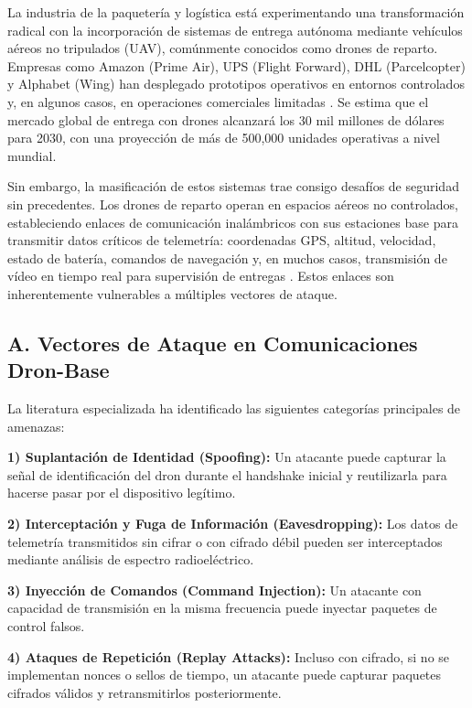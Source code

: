 La industria de la paquetería y logística está experimentando una transformación radical con la incorporación de sistemas de entrega autónoma mediante vehículos aéreos no tripulados (UAV), comúnmente conocidos como drones de reparto. Empresas como Amazon (Prime Air), UPS (Flight Forward), DHL (Parcelcopter) y Alphabet (Wing) han desplegado prototipos operativos en entornos controlados y, en algunos casos, en operaciones comerciales limitadas \cite{amazon2022drone}. Se estima que el mercado global de entrega con drones alcanzará los 30 mil millones de dólares para 2030, con una proyección de más de 500,000 unidades operativas a nivel mundial.

Sin embargo, la masificación de estos sistemas trae consigo desafíos de seguridad sin precedentes. Los drones de reparto operan en espacios aéreos no controlados, estableciendo enlaces de comunicación inalámbricos con sus estaciones base para transmitir datos críticos de telemetría: coordenadas GPS, altitud, velocidad, estado de batería, comandos de navegación y, en muchos casos, transmisión de vídeo en tiempo real para supervisión de entregas \cite{yaacoub2020drone}. Estos enlaces son inherentemente vulnerables a múltiples vectores de ataque.

\subsection*{A. Vectores de Ataque en Comunicaciones Dron-Base}

La literatura especializada ha identificado las siguientes categorías principales de amenazas:

\textbf{1) Suplantación de Identidad (Spoofing):} Un atacante puede capturar la señal de identificación del dron durante el handshake inicial y reutilizarla para hacerse pasar por el dispositivo legítimo.

\textbf{2) Interceptación y Fuga de Información (Eavesdropping):} Los datos de telemetría transmitidos sin cifrar o con cifrado débil pueden ser interceptados mediante análisis de espectro radioeléctrico.

\textbf{3) Inyección de Comandos (Command Injection):} Un atacante con capacidad de transmisión en la misma frecuencia puede inyectar paquetes de control falsos.

\textbf{4) Ataques de Repetición (Replay Attacks):} Incluso con cifrado, si no se implementan nonces o sellos de tiempo, un atacante puede capturar paquetes cifrados válidos y retransmitirlos posteriormente.


